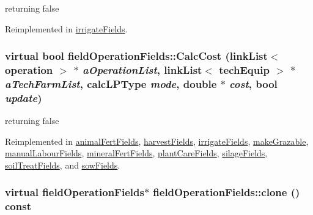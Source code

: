 returning false 

Reimplemented in \hyperlink{classirrigate_fields_a288149c6a4e9bc3d60cf8f3494aa274f}{irrigateFields}.\hypertarget{classfield_operation_fields_aeb2bce9d4612033dbab366d870e432a6}{
\subsubsection[{CalcCost}]{\setlength{\rightskip}{0pt plus 5cm}virtual bool fieldOperationFields::CalcCost ({\bf linkList}$<$ {\bf operation} $>$ $\ast$ {\em aOperationList}, \/  {\bf linkList}$<$ {\bf techEquip} $>$ $\ast$ {\em aTechFarmList}, \/  {\bf calcLPType} {\em mode}, \/  double $\ast$ {\em cost}, \/  bool {\em update})}}
\label{classfield_operation_fields_aeb2bce9d4612033dbab366d870e432a6}


returning false 

Reimplemented in \hyperlink{classanimal_fert_fields_a45dd2c78a88e638206b14b82616c8e90}{animalFertFields}, \hyperlink{classharvest_fields_a9fcfd4121d8290708c8db3da63a56d78}{harvestFields}, \hyperlink{classirrigate_fields_a2180e7648439e025e85c304388260f14}{irrigateFields}, \hyperlink{classmake_grazable_ae09405366070332941b95c92b334c6c1}{makeGrazable}, \hyperlink{classmanual_labour_fields_a1baebed54c58272b5127e0fe713b1eea}{manualLabourFields}, \hyperlink{classmineral_fert_fields_a9d71379448708130be77ca7166bb99dc}{mineralFertFields}, \hyperlink{classplant_care_fields_a14bb648891c128209ae40889534b4257}{plantCareFields}, \hyperlink{classsilage_fields_a5ae420a0878bc7f89c3a6fe03f585163}{silageFields}, \hyperlink{classsoil_treat_fields_a1b486e3dcf8ea9e3c0e8c58ec801a3e9}{soilTreatFields}, and \hyperlink{classsow_fields_a7834909587530be2801797f19d3fa242}{sowFields}.\hypertarget{classfield_operation_fields_ae5d8585b7e57196ce3801eed29677b3e}{
\subsubsection[{clone}]{\setlength{\rightskip}{0pt plus 5cm}virtual {\bf fieldOperationFields}$\ast$ fieldOperationFields::clone () const}}
\label{classfield_operation_fields_ae5d8585b7e57196ce3801eed29677b3e}


